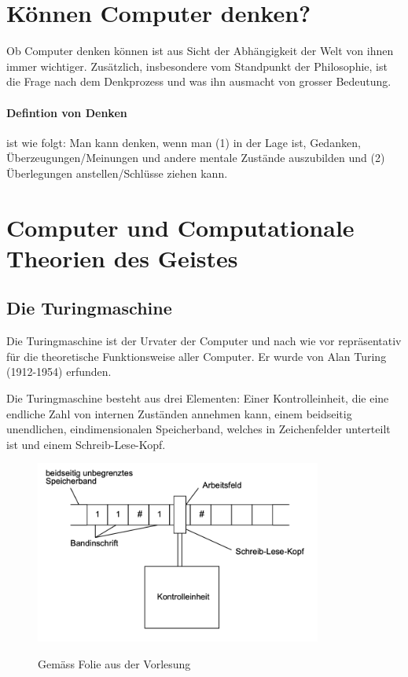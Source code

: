 \documentclass[../main.tex]{subfiles}
\begin{document}
\section{Können Computer denken?}
Ob Computer denken können ist aus Sicht der Abhängigkeit der Welt von ihnen immer wichtiger. Zusätzlich, insbesondere vom Standpunkt der Philosophie, ist die Frage nach dem Denkprozess und was ihn ausmacht von grosser Bedeutung. 

\paragraph{Defintion von Denken} ist wie folgt: Man kann denken, wenn man (1) in der Lage ist, Gedanken, Überzeugungen/Meinungen und andere mentale Zustände auszubilden und (2) Überlegungen anstellen/Schlüsse ziehen kann. 

\section{Computer und Computationale Theorien des Geistes}
\subsection{Die Turingmaschine}
Die Turingmaschine ist der Urvater der Computer und nach wie vor repräsentativ für die theoretische Funktionsweise aller Computer. Er wurde von Alan Turing (1912-1954) erfunden. 

Die Turingmaschine besteht aus drei Elementen: Einer Kontrolleinheit, die eine endliche Zahl von internen Zuständen annehmen kann, einem beidseitig unendlichen, eindimensionalen Speicherband, welches in Zeichenfelder unterteilt ist und einem Schreib-Lese-Kopf. 

\begin{figure}[!htb]
\centering
{\centering\includegraphics[height=6cm]{images/turing_maschine.png}\endcenter}
\caption{Gemäss Folie aus der Vorlesung}
\end{figure}
\end{document}
